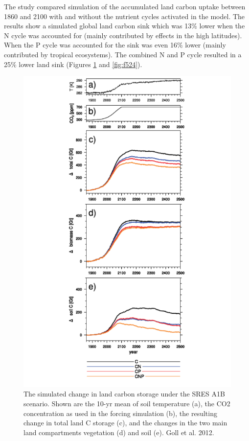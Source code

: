 \documentclass[12pt,oneside]{book}
\begin{document}
The study compared simulation of the accumulated land carbon uptake
between 1860 and 2100 with and without the nutrient cycles activated in
the model. The results show a simulated global land carbon sink which
was 13\% lower when the N cycle was accounted for (mainly contributed by
effects in the high latitudes). When the P cycle was accounted for the
sink was even 16\% lower (mainly contributed by tropical ecosystems).
The combined N and P cycle resulted in a 25\% lower land sink (Figures
\ref{fig:f523} and \ref{fig:f524}).

\begin{figure}

{\centering \includegraphics[width=0.8\linewidth]{figures/chap5/f523_goll_sink} 

}

\caption{The simulated change in land carbon storage under the SRES A1B scenario. Shown are the 10-yr mean of soil temperature (a), the CO2 concentration as used in the forcing simulation (b), the resulting change in total land C storage (c), and the changes in the two main land compartments vegetation (d) and soil (e). Goll et al. 2012.}\label{fig:f523}
\end{figure}
\end{document}
